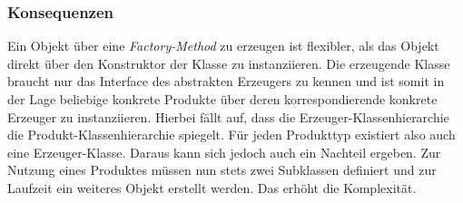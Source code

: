 \subsubsection*{Konsequenzen}
Ein Objekt über eine \emph{Factory-Method} zu erzeugen ist flexibler, als das Objekt direkt über den Konstruktor der Klasse zu instanziieren. Die erzeugende Klasse braucht nur das Interface des abstrakten Erzeugers zu kennen und ist somit in der Lage beliebige konkrete Produkte über deren korrespondierende konkrete Erzeuger zu instanziieren. Hierbei fällt auf, dass die Erzeuger-Klassenhierarchie die Produkt-Klassenhierarchie spiegelt. Für jeden Produkttyp existiert also auch eine Erzeuger-Klasse. Daraus kann sich jedoch auch ein Nachteil ergeben. Zur Nutzung eines Produktes müssen nun stets zwei Subklassen definiert und zur Laufzeit ein weiteres Objekt erstellt werden. Das erhöht die Komplexität. \cite{gamma_design_1995}

